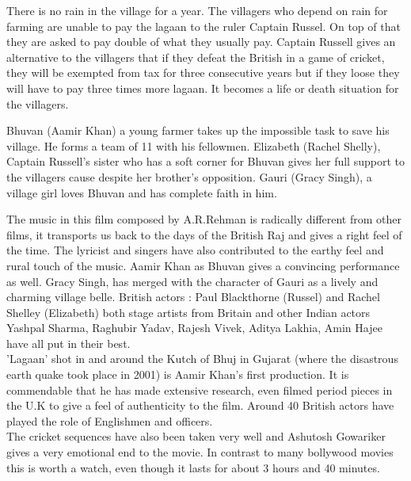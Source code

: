 \documentclass[a4paper]{article}
\begin{document}
	  There is no rain in the village for a year. The villagers who depend on rain for farming are unable to pay the lagaan to the ruler Captain Russel. On top of that they are asked to pay double of what they usually pay. Captain Russell gives an alternative to the villagers that if they defeat the British in a game of cricket, they will be exempted from tax for three consecutive years but if they loose they will have to pay three times more lagaan. It becomes a life or death situation for the villagers.


	  
	  Bhuvan (Aamir Khan) a young farmer takes up the impossible task to save his village. He forms a team of 11 with his fellowmen. Elizabeth (Rachel Shelly), Captain Russell's sister who has a soft corner for Bhuvan gives her full support to the villagers cause despite her brother's opposition. Gauri (Gracy Singh), a village girl loves Bhuvan and has complete faith in him.

The music in this film composed by A.R.Rehman is radically different from other films, it transports us back to the days of the British Raj and gives a right feel of the time. The lyricist and singers have also contributed to the earthy feel and rural touch of the music. Aamir Khan as Bhuvan gives a convincing performance as well. Gracy Singh, has merged with the character of Gauri as a lively and charming village belle. British actors : Paul Blackthorne (Russel) and Rachel Shelley (Elizabeth) both stage artists from Britain and other Indian actors Yashpal Sharma, Raghubir Yadav, Rajesh Vivek, Aditya Lakhia, Amin Hajee have all put in their best.
\\
'Lagaan' shot in and around the Kutch of Bhuj in Gujarat (where the disastrous earth quake took place in 2001) is Aamir Khan's first production. It is commendable that he has made extensive research, even filmed period pieces in the U.K to give a feel of authenticity to the film. Around 40 British actors have played the role of Englishmen and officers.
\\
The cricket sequences have also been taken very well and Ashutosh Gowariker gives a very emotional end to the movie. In contrast to many bollywood movies this is worth a watch, even though it lasts for about 3 hours and 40 minutes.
	  
	  
	  

	        
	        
\end{document}

